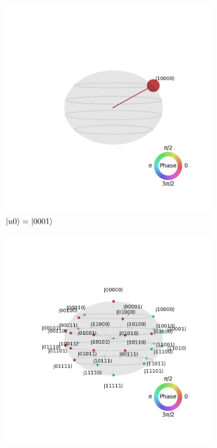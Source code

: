 \documentclass[12pt,a4paper]{article}
\DeclarePairedDelimiter\ket{\lvert}{\rangle}
\begin{document}
\begin{figure}[bth]
  \begin{subfigure}[b]{0.3\textwidth}
      \centering
      \includegraphics[width=\textwidth]{images/visualization_eq_2_u1.png}
      \caption{$\ket{u0}=\ket{0001}$}
  \end{subfigure}
  \begin{subfigure}[b]{0.3\textwidth}
      \centering
      \includegraphics[width=\textwidth]{images/visualization_eq_2_u2.png}

\end{subfigure}
\end{figure}
\end{document}
